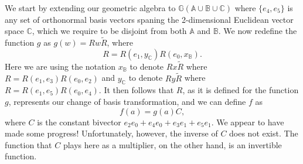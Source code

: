 \documentclass[12pt]{article}
\newcommand{\G}{\mathbb{G}}
\newcommand{\A}{\mathbb{A}}
\newcommand{\B}{\mathbb{B}}
\newcommand{\C}{\mathbb{C}}
\begin{document}
We start by extending
our geometric algebra to $\G(\A\cup\B\cup\C)$ where $\{e_4,e_5\}$ is any
set of orthonormal basis vectors spaning the 2-dimensional Euclidean vector
space $\C$, which we require to be disjoint from both $\A$ and $\B$.
We now redefine the function $g$ as $g(w)=Rw\tilde{R}$, where
\begin{equation*}
R=R\left(e_1,y_{\C}\right)R\left(e_0,x_{\B}\right).
\end{equation*}
Here we are using the notation
$x_{\B}$ to denote $Rx\tilde{R}$ where $R=R(e_1,e_3)R(e_0,e_2)$ and
$y_{\C}$ to denote $Ry\tilde{R}$ where $R=R(e_1,e_5)R(e_0,e_4)$.
It then follows that $R$, as it is defined for the function $g$, represents our
change of basis transformation, and we can define $f$ as
\begin{equation*}
f(a) = g(a)C,
\end{equation*}
where $C$ is the constant bivector $e_2e_0+e_4e_0 + e_3e_1 + e_5e_1$.
We appear to have made some progress!  Unfortunately, however, the
inverse of $C$ does not exist.  The function that $C$ plays here as a multiplier,
on the other hand, is an invertible function.




\end{document}
